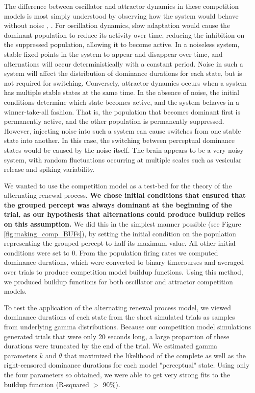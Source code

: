 \documentclass[10pt]{article}
\begin{document}
The difference between oscillator and attractor dynamics in these competition models is most simply understood by observing how the system would behave without noise \cite{Shpiro2009}, \cite{Moreno-Bote2007}. For oscillation dynamics, slow adaptation would cause the dominant population to reduce its activity over time, reducing the inhibition on the suppressed population, allowing it to become active. In a noiseless system, stable fixed points in the system to appear and disappear over time, and alternations will occur deterministically with a constant period. Noise in such a system will affect the distribution of dominance durations for each state, but is not required for switching. Conversely, attractor dynamics occurs when a system has multiple stable states at the same time. In the absence of noise, the initial conditions determine which state becomes active, and the system behaves in a winner-take-all fashion. That is, the population that becomes dominant first is permanently active, and the other population is permanently suppressed. However, injecting noise into such a system can cause switches from one stable state into another. In this case, the switching between perceptual dominance states would be caused by the noise itself. The brain appears to be a very noisy system, with random fluctuations occurring at multiple scales such as vesicular release and spiking variability.

We wanted to use the competition model as a test-bed for the theory of the alternating renewal process. \textbf{We chose initial conditions that ensured that the grouped percept was always dominant at the beginning of the trial, as our hypothesis that alternations could produce buildup relies on this assumption.} We did this in the simplest manner possible (see Figure \ref{fig:making_comp_BUFs}), by setting the initial condition on the population representing the grouped percept to half its maximum value. All other initial conditions were set to 0. From the population firing rates we computed dominance durations, which were converted to binary timecourses and averaged over trials to produce competition model buildup functions. Using this method, we produced buildup functions for both oscillator and attractor competition models.

To test the application of the alternating renewal process model, we viewed dominance durations of each state from the short simulated trials as samples from underlying gamma distributions. Because our competition model simulations generated trials that were only 20 seconds long, a large proportion of these durations were truncated by the end of the trial. We estimated gamma parameters $k$ and $\theta$ that maximized the likelihood of the complete as well as the right-censored dominance durations for each model "perceptual" state. Using only the four parameters so obtained, we were able to get very strong fits to the buildup function (R-squared $>$ 90\%).
\end{document}
